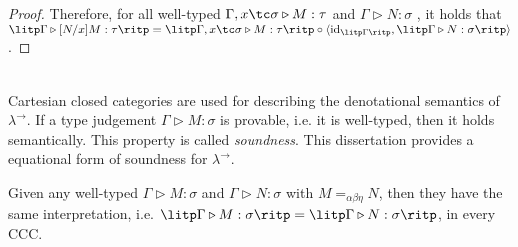 \begin{proof}
Therefore, for all well-typed $ \Gamma , x \tc \sigma \triangleright M: \tau $ and $ \Gamma \triangleright N: \sigma $ , it holds that $ \litp \Gamma \triangleright [N/x]M: \tau \ritp = \litp \Gamma , x \tc \sigma \triangleright M: \tau \ritp \circ \langle \textnormal{id}_{\litp \Gamma \ritp} , \litp \Gamma \triangleright N: \sigma \ritp \rangle $.

\end{proof}
\mbox\\
\\
Cartesian closed categories are used for describing the denotational semantics of $ \lambda^{\to} $. If a type judgement $ \Gamma \triangleright M: \sigma $ is provable, i.e. it is well-typed, then it holds semantically. This property is called \emph{soundness}. This dissertation provides a equational form of soundness for $ \lambda^{\to} $.

\begin{theorem}
\label{theorem:soundness}
Given any well-typed $ \Gamma \triangleright M: \sigma $ and $ \Gamma \triangleright N: \sigma $ with $ M =_{\alpha \beta \eta} N $, then they have the same interpretation, i.e. $ \litp \Gamma \triangleright M: \sigma \ritp = \litp \Gamma \triangleright N: \sigma \ritp $, in every CCC.
\end{theorem}

